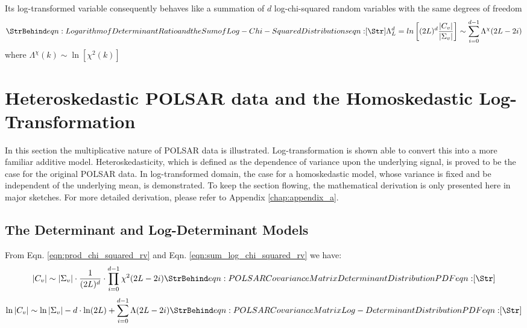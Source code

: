 Its log-transformed variable consequently 
  behaves like a summation of $d$ log-chi-squared random variables with the same degrees of freedom  
\begin{equation}
\label{eqn:sum_log_chi_squared_rv}
\caption{eqn:Logarithm of Determinant Ratio and the Sum of Log-Chi-Squared Distributions}
\Lambda^d_L = ln \left[ (2L)^d \frac{|C_v|}{|\Sigma_v|} \right] \sim \sum_{i=0}^{d-1} \Lambda^\chi (2L-2i)
\end{equation}
where $\Lambda^\chi (k) \sim \ln \left[ \chi^2 (k) \right]$

\section{Heteroskedastic POLSAR data and the Homoskedastic Log-Transformation}
\label{sec:polsar_heterosked_model_and_log_transform}

In this section the multiplicative nature of POLSAR data is illustrated.
Log-transformation is shown able to convert this into a more familiar additive model.
Heteroskedasticity, which is defined as the dependence of variance upon the underlying signal,
  is proved to be the case for the original POLSAR data.
In log-transformed domain, the case for a homoskedastic model,
  whose variance is fixed and be independent of the underlying mean,
  is demonstrated.
To keep the section flowing, the mathematical derivation is only presented here in major sketches.
For more detailed derivation, please refer to Appendix \ref{chap:appendix_a}.

\subsection{The Determinant and Log-Determinant Models}

From Eqn. \ref{eqn:prod_chi_squared_rv} and Eqn. \ref{eqn:sum_log_chi_squared_rv}
we have:
\begin{equation}
  |C_v| \sim |\Sigma_v| \cdot \frac{1}{(2L)^d} \cdot \prod_{i=0}^{d-1} \chi^2 (2L-2i)
  \label{eqn:determinant_distribution}
  \caption{eqn:POLSAR Covariance Matrix Determinant Distribution PDF}    
\end{equation}
\begin{equation}
  \ln|C_v| \sim \ln|\Sigma_v| - d \cdot \ln(2L) + \sum^{d-1}_{i=0} \Lambda(2L-2i)
  \label{eqn:log_determinant_distribution}  
  \caption{eqn:POLSAR Covariance Matrix Log-Determinant Distribution PDF}    
\end{equation}

